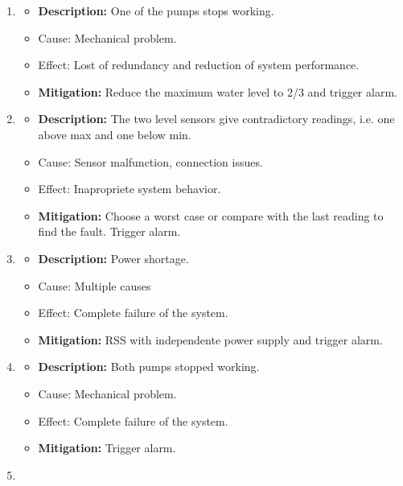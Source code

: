 \documentclass[11pt]{article}
\begin{document}
\begin{enumerate}[leftmargin=4em, font=\small, label=\textbf{H-\arabic*:}]
	\setlength\itemsep{.5em}
	\item 
		\begin{itemize}
		\setlength\itemsep{0em}
        		\item \textbf{Description:} One of the pumps stops working.
		\item Cause: Mechanical problem.
    		\item Effect: Lost of redundancy and reduction of system performance.
    		\item \textbf{Mitigation:} Reduce the maximum water level to 2/3 and trigger alarm.
		\end{itemize}
	\item 
		\begin{itemize}
		\setlength\itemsep{0em}
    		\item \textbf{Description:} The two level sensors give contradictory readings, i.e. one above max and one below min.
		\item Cause: Sensor malfunction, connection issues.
    		\item Effect: Inapropriete system behavior. 
    		\item \textbf{Mitigation:} Choose a worst case or compare with the last reading to find the fault. Trigger alarm.
		\end{itemize}
	\item 
		\begin{itemize}
		\setlength\itemsep{0em}
    		\item \textbf{Description:} Power shortage.
		\item Cause: Multiple causes
    		\item Effect: Complete failure of the system.
    		\item \textbf{Mitigation:} RSS with independente power supply and trigger alarm.
		\end{itemize} 
	\item 
		\begin{itemize}
		\setlength\itemsep{0em}
    		\item \textbf{Description:} Both pumps stopped working.
		\item Cause: Mechanical problem.
    		\item Effect: Complete failure of the system.
    		\item \textbf{Mitigation:} Trigger alarm.
		\end{itemize} 
	\item 

\end{enumerate}
\end{document}
